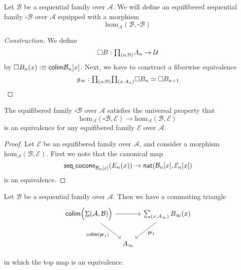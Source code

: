\begin{defn}
Let $\mathcal{B}$ be a sequential family over $\mathcal{A}$. We will define an equifibered sequential family $\square\mathcal{B}$ over $\mathcal{A}$ equipped with a morphism 
\begin{equation*}
\mathrm{hom}_{\mathcal{A}}(\mathcal{B},\square\mathcal{B})
\end{equation*}
\end{defn}

\begin{proof}[Construction]
We define
\begin{equation*}
\square B : \prd{n:\N}A_n\to\UU
\end{equation*}
by $\square B_n(x)\vcentcolon\equiv \mathsf{colim} \mathcal{B}_n[x]$. Next, we have to construct a fiberwise equivalence
\begin{equation*}
g_\infty : \prd{n:\N}{x:A_n} \square B_n \eqvsym \square B_{n+1}
\end{equation*}
\end{proof}

\begin{thm}\label{thm:colim_fib}
The equifibered family $\square\mathcal{B}$ over $\mathcal{A}$ satisfies the universal property that
\begin{equation*}
\mathrm{hom}_{\mathcal{A}}(\square\mathcal{B},\mathcal{E})\to\mathrm{hom}_{\mathcal{A}}(\mathcal{B},\mathcal{E})
\end{equation*}
is an equivalence for any equifibered family $\mathcal{E}$ over $\mathcal{A}$. 
\end{thm}

\begin{proof}
Let $\mathcal{E}$ be an equifibered family over $\mathcal{A}$, and consider a morphism $\mathrm{hom}_{\mathcal{A}}(\mathcal{B},\mathcal{E})$. First we note that the canonical map
\begin{equation*}
\mathsf{seq\underline{\ }{}cocone}_{\mathcal{B}_n[x]}(E_n(x)) \to \mathsf{nat}(\mathcal{B}_n[x],\mathcal{E}_n[x])
\end{equation*}
is an equivalence.
\end{proof}

\begin{cor}\label{thm:colim_sigma}
Let $\mathcal{B}$ be a sequential family over $\mathcal{A}$. Then we have a commuting triangle
\begin{equation*}
\begin{tikzcd}[column sep=tiny]
\mathsf{colim}\Big(\msm{\mathcal{A}}{\mathcal{B}}\Big) \arrow[rr] \arrow[dr,swap,"\mathsf{colim}(\proj 1)"] & & \sm{x:A_\infty} B_\infty(x) \arrow[dl,"\proj 1"] \\
\phantom{\sm{x:A_\infty} B_\infty(x)} & A_\infty & \phantom{\mathsf{colim}\Big(\msm{\mathcal{A}}{\mathcal{B}}\Big)}
\end{tikzcd}
\end{equation*}
in which the top map is an equivalence.
\end{cor}

